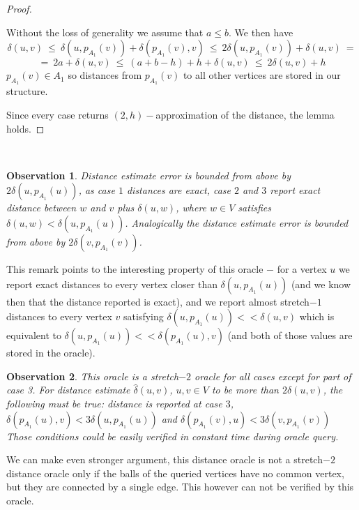 \documentclass[shortabstract, lic, english]{iithesis}
\theoremstyle{definition} \newtheorem{definition}{Definition}[chapter]
\theoremstyle{plain} \newtheorem{remark}[definition]{Observation}
\theoremstyle{plain} \newtheorem{theorem}[definition]{Theorem}
\theoremstyle{plain} \newtheorem{lemma}[definition]{Lemma}
\theoremstyle{plain} \newtheorem{conjecture}[definition]{Conjecture}
\begin{document}
\begin{proof}
\begin{enumerate}
            Without the loss of generality we assume that $a \leq b$. We then have 
            $$\delta(u, v) ~\leq~ \delta(u, p_{A_1}(v)) + \delta(p_{A_1}(v), v) ~\leq~ 2\delta(u, p_{A_1}(v)) + \delta(u, v) ~=$$
            $$=~ 2a + \delta(u,v) ~\leq~ (a + b - h) + h + \delta(u,v) ~\leq~ 2\delta(u, v) + h$$
            $p_{A_1}(v) \in A_1$ so distances from $p_{A_1}(v)$ to all other vertices are stored in our structure.
    \end{enumerate}
    Since every case returns $(2,h)-$approximation of the distance, the lemma holds.
\end{proof}

~

\begin{remark}
    Distance estimate error is bounded from above by $2\delta(u, p_{A_1}(u))$,
    as case $1$ distances are exact, case $2$ and $3$ report exact distance between $w$ and $v$ plus $\delta(u, w)$, where $w \in V$ satisfies $\delta(u, w) < \delta(u, p_{A_1}(u))$.
    Analogically the distance estimate error is bounded from above by $2\delta(v, p_{A_1}(v))$.
\end{remark}

This remark points to the interesting property of this oracle $-$ for a vertex $u$ we report exact distances to every vertex closer than $\delta(u, p_{A_1}(u))$ (and we know then that the distance reported is exact),
and we report almost stretch$-1$ distances to every vertex $v$ satisfying $\delta(u, p_{A_1}(u)) << \delta(u, v)$ which is equivalent to $\delta(u, p_{A_1}(u)) << \delta(p_{A_1}(u), v)$ (and both of those values are stored in the oracle).

\begin{remark}
    This oracle is a stretch$-2$ oracle for all cases except for part of case 3.
    For distance estimate $\hat{\delta}(u, v)$, $u,v \in V$ to be more than $2\delta(u,v)$,
    the following must be true: distance is reported at case $3$,
    $\delta(p_{A_1}(u), v) < 3\delta(u, p_{A_1}(u))$ and $\delta(p_{A_1}(v), u) < 3\delta(v, p_{A_1}(v))$
    Those conditions could be easily verified in constant time during oracle query.
\end{remark}

We can make even stronger argument, this distance oracle is not a stretch$-2$ distance oracle only if the balls of the queried vertices have no common vertex, but they are connected by a single edge.
This however can not be verified by this oracle.
\end{document}
